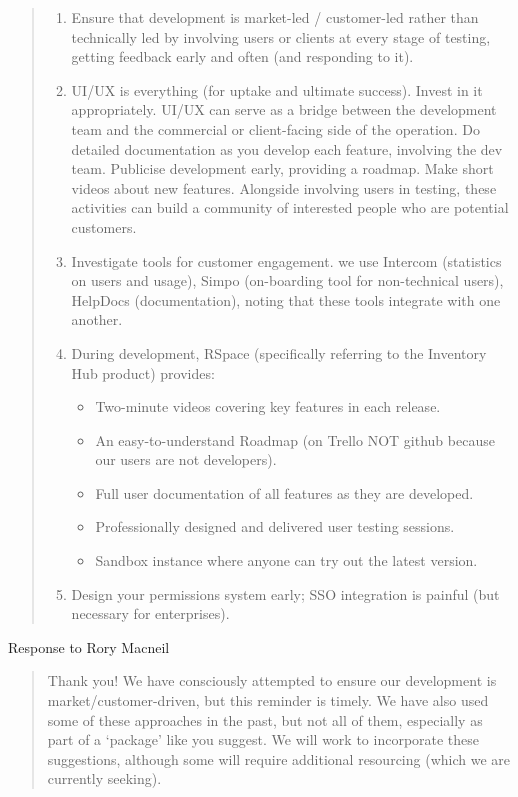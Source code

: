\documentclass{faims3_report}
\begin{document}
\begin{quote}
\begin{enumerate}[itemsep=1em]

\item Ensure that development is market-led / customer-led rather than technically led by 
   involving users or clients at every stage of testing, getting feedback early and often 
   (and responding to it). 
   
\item UI/UX is everything (for uptake and ultimate success). Invest in it appropriately. UI/UX can serve as a bridge 
   between the development team and the commercial or client-facing side of the operation.
   Do detailed documentation as you develop each feature, involving the dev team. Publicise
   development early, providing a roadmap. Make short videos about new features. 
   Alongside involving users in testing, these activities
   can build a community of interested people who are potential customers. 
   
\item Investigate tools for customer engagement. we use Intercom (statistics on users and usage),
   Simpo (on-boarding tool for non-technical users), HelpDocs (documentation), noting that these tools 
   integrate with one another.
   
\item During development, RSpace (specifically referring to the Inventory Hub product) provides:
   \begin{itemize}
     \item Two-minute videos covering key features in each release.
     \item An easy-to-understand Roadmap (on Trello NOT github because our users are not developers).
     \item Full user documentation of all features as they are developed.
     \item Professionally designed and delivered user testing sessions.
     \item Sandbox instance where anyone can try out the latest version.
   \end{itemize}
\item Design your permissions system early; SSO integration is painful (but necessary for enterprises).

\end{enumerate}
\end{quote}

Response to Rory Macneil

\begin{quote}
Thank you! We have consciously attempted to ensure our development is market/customer-driven, 
but this reminder is timely. We have also used some of these approaches in the past, but 
not all of them, especially as part of a `package' like you suggest. We will work to 
incorporate these suggestions, although some will require additional resourcing 
(which we are currently seeking).
\end{quote}

\end{document}
